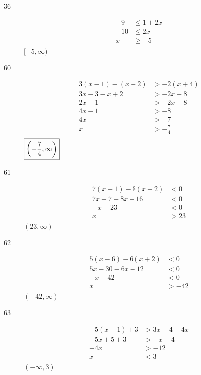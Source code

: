 \documentclass[letterpaper, landscape]{exam}
\begin{document}
\begin{description}
      \item[36]
        \begin{align*}
          -9  & \leq 1 + 2x \\
          -10 & \leq 2x \\
           x  & \geq -5 \\
        \end{align*}
        $\boxed{ [-5, \infty) }$

      \newpage

      \item[60]
        \begin{align*}
          3(x - 1) - (x - 2) & > -2(x + 4) \\
          3x - 3 - x + 2     & > -2x - 8 \\
          2x - 1             & > -2x - 8 \\
          4x - 1             & > -8 \\
          4x                 & > -7 \\
          x                  & > -\frac{7}{4} \\
        \end{align*}
        $\boxed{ \del{-\frac{7}{4}, \infty} }$

      \item[61]
        \begin{align*}
          7(x + 1) - 8(x - 2) & < 0 \\
          7x + 7 - 8x + 16    & < 0 \\
          -x + 23             & < 0 \\
          x                   & > 23 \\
        \end{align*}
        $\boxed{ (23, \infty) }$

      \item[62]
        \begin{align*}
          5(x - 6) -6(x + 2) & < 0 \\
          5x - 30 - 6x -12   & < 0 \\
          -x - 42            & < 0 \\
          x                  & > -42 \\
        \end{align*}
        $\boxed{ (-42, \infty) }$

      \item[63]
        \begin{align*}
          -5(x - 1) + 3 & > 3x - 4 -4x \\
          -5x + 5 + 3   & > -x - 4 \\
          -4x           & > -12 \\
          x             & < 3 \\
        \end{align*}
        $\boxed{ (-\infty, 3) }$


\end{description}
\end{document}
